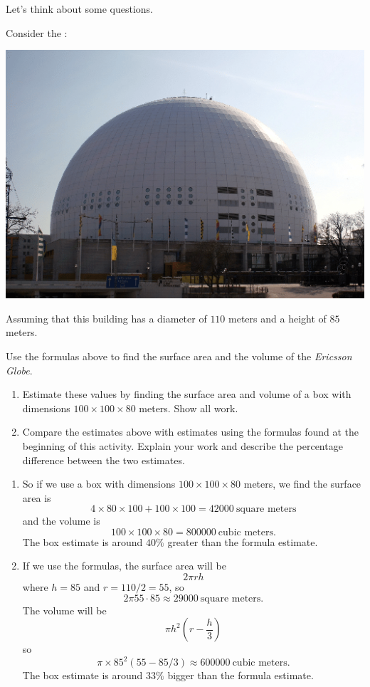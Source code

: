 \documentclass[handout,nooutcomes,noauthor,hints]{ximera}
\begin{document}
Let's think about some questions. 


\mynewpage




\begin{question} \label{FG1:1}
  Consider the :
   \begin{center}
    \includegraphics[width=.4\textwidth]{dome.png} %
   \end{center}
   Assuming that this building has a diameter of $110$ meters and a
   height of $85$ meters.
   
   Use the formulas above to find the surface area
   and the volume of the \textit{Ericsson Globe}.
\begin{enumerate}
\item Estimate these values by finding the surface area and volume of
  a box with dimensions $100\times 100 \times 80$ meters. Show all work.
\item Compare the estimates above with estimates using the formulas
  found at the beginning of this activity. Explain your work and
  describe the percentage difference between the two estimates.
\end{enumerate}
\begin{freeResponse}
  \begin{enumerate}
  \item So if we use a box with dimensions $100\times 100 \times 80$ meters,
    we find the surface area is
    \[
    4\times 80 \times 100 +100\times 100= 42000~\text{square meters}
    \]
    and the volume is
    \[
    100\times 100 \times 80 = 800000~\text{cubic meters.}
    \]
    The box estimate is around $40\%$ greater than the formula
    estimate.
  \item If we use the formulas, the surface area will be
    \[
    2\pi rh
    \]
    where $h=85$ and $r= 110/2 = 55$, so
    \[
    2\pi 55\cdot 85 \approx  29000~\text{square meters}.
    \]
    The volume will be
    \[
    \pi h^2 \left( r- \frac{h}{3}\right)
    \]
    so
    \[
    \pi \times 85^2 (55 - 85/3) \approx 600000 ~\text{cubic meters.}
    \]
    The box estimate is around $33\%$ bigger than the formula
    estimate.
  \end{enumerate}
\end{freeResponse}
   \end{question}
\mynewpage
\end{document}
